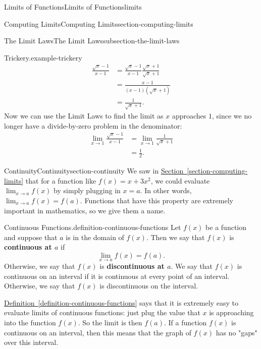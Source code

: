 \documentclass[oneside,10pt,]{book}
\newcommand{\terminology}[1]{\textbf{#1}}
\numberwithin{equation}{section}
\begin{document}
\begin{chapterptx}{Limits of Functions}{}{Limits of Functions}{}{}{limits}
\begin{sectionptx}{Computing Limits}{}{Computing Limits}{}{}{section-computing-limits}
\begin{subsectionptx}{The Limit Laws}{}{The Limit Laws}{}{}{subsection-the-limit-laws}
\begin{example}{Trickery.}{example-trickery}
%
\begin{align*}
\frac{\sqrt{x}-1}{x-1} & = \frac{\sqrt{x}-1}{x-1}\frac{\sqrt{x}+1}{\sqrt{x}+1} \\
& = \frac{x - 1}{(x-1)(\sqrt{x}+1)} \\
& = \frac{1}{\sqrt{x}+1}. 
\end{align*}
\hypertarget{p-30}{}%
Now we can use the Limit Laws to find the limit as \(x\) approaches \(1\), since we no longer have a divide-by-zero problem in the denominator:%
%
\begin{align*}
\lim_{x\to1}\frac{\sqrt{x}-1}{x-1} & = \lim_{x\to1}\frac{1}{\sqrt{x}+1} \\
& = \frac{1}{2}. 
\end{align*}
\end{example}
\end{subsectionptx}
\end{sectionptx}
%
%
\typeout{************************************************}
\typeout{************************************************}
%
\begin{sectionptx}{Continuity}{}{Continuity}{}{}{section-continuity}
\hypertarget{p-31}{}%
We saw in \hyperref[section-computing-limits]{Section~\ref{section-computing-limits}} that for a function like \(f(x) = x+3x^{2}\), we could evaluate \(\lim_{x\to a}f(x)\) by simply plugging in \(x=a\). In other words, \(\lim_{x\to a}f(x) = f(a)\). Functions that have this property are extremely important in mathematics, so we give them a name.%
\begin{definition}{Continuous Functions.}{definition-continuous-functions}%
\hypertarget{p-32}{}%
Let \(f(x)\) be a function and suppose that \(a\) is in the domain of \(f(x)\). Then we say that \(f(x)\) is \terminology{continuous at \(a\)} if%
\begin{equation*}
\lim_{x\to a}f(x) = f(a)\text{.}
\end{equation*}
Otherwise, we say that \(f(x)\) is \terminology{discontinuous at \(a\)}. We say that \(f(x)\) is continuous on an interval if it is continuous at every point of an interval. Otherwise, we say that \(f(x)\) is discontinuous on the interval.%
\end{definition}
\hypertarget{p-33}{}%
\hyperref[definition-continuous-functions]{Definition~\ref{definition-continuous-functions}} says that it is extremely easy to evaluate limits of continuous functions: just plug the value that \(x\) is approaching into the function \(f(x)\). So the limit is then \(f(a)\). If a function \(f(x)\) is continuous on an interval, then this means that the graph of \(f(x)\) has no "gaps" over this interval.%

\end{sectionptx}
\end{chapterptx}
\end{document}

